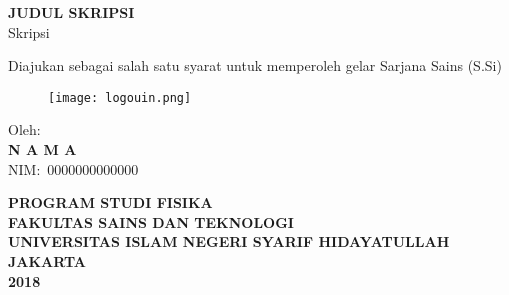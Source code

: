 \begin{center}
    {\textbf{\Large JUDUL SKRIPSI}}\\
    \vspace{2cm}
    {\large Skripsi}

    Diajukan sebagai salah satu syarat untuk memperoleh gelar Sarjana Sains (S.Si)

    \begin{figure}[H]
        \centering
        \vspace{1cm}
        \texttt{[image: logouin.png]}\label{fig:logouin}\\
        \vspace{2cm}
    \end{figure}

    Oleh:\\
    \textbf{N A M A}\\
    NIM:\ 0000000000000\\
    \vfill

    {%
    \bfseries 
        PROGRAM STUDI FISIKA\\
        FAKULTAS SAINS DAN TEKNOLOGI\\
        UNIVERSITAS ISLAM NEGERI SYARIF HIDAYATULLAH\\
        JAKARTA\\
        2018\\
    }
\end{center}
